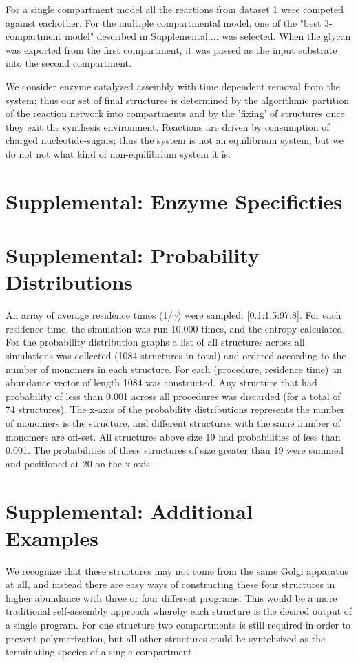 \documentclass{article}
\begin{document}
For a single compartment model all the reactions from dataset 1 were competed against eachother. For the multiple compartmental model, one of the "best 3-compartment model" described in Supplemental.... was selected. When the glycan was exported from the first compartment, it was passed as the input substrate into the second compartment. 

We consider enzyme catalyzed assembly with time dependent removal from the system; thus our set of final structures is determined by the algorithmic partition of the reaction network into compartments and by the 'fixing' of structures once they exit the synthesis environment. Reactions are driven by consumption of charged nucleotide-sugars; thus the system is not an equilibrium system, but we do not not what kind of non-equilibrium system it is. 

\section*{Supplemental: Enzyme Specificties}



\section*{Supplemental: Probability Distributions}
An array of average residence times (1/$\gamma$) were sampled: [0.1:1.5:97.8]. For each residence time, the simulation was run 10,000 times, and the entropy calculated. For the probability distribution graphs a list of all structures across all simulations was collected (1084 structures in total) and ordered according to the number of monomers in each structure. For each (procedure, residence time) an abundance vector of length 1084 was constructed. Any structure that had probability of less than 0.001 across all procedures was discarded (for a total of 74 structures). The x-axis of the probability distributions represents the number of monomers is the structure, and different structures with the same number of monomers are off-set. All structures above size 19 had probabilities of less than 0.001. The probabilities of these structures of size greater than 19 were summed and positioned at 20 on the x-axis. 


\section*{Supplemental: Additional Examples}
We recognize that these structures may not come from the same Golgi apparatus at all, and instead there are easy ways of constructing these four structures in higher abundance with three or four different programs. This would be a more traditional self-assembly approach whereby each structure is the desired output of a single program. For one structure two compartments is still required in order to prevent polymerization, but all other structures could be syntehsized as the terminating species of a single compartment. 
\end{document}
